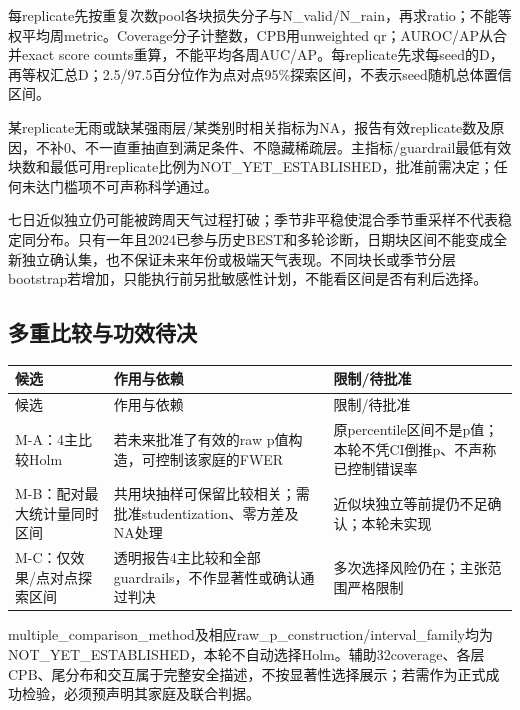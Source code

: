 \documentclass[UTF8,fontset=fandol,10pt]{ctexart}
\begin{document}
每replicate先按重复次数pool各块损失分子与N\_\allowbreak{}valid/\allowbreak{}N\_\allowbreak{}rain，再求ratio；不能等权平均周metric。Coverage分子计整数，CPB用unweighted qr；AUROC/\allowbreak{}AP从合并exact score counts重算，不能平均各周AUC/\allowbreak{}AP。每replicate先求每seed的D，再等权汇总D；2.5/\allowbreak{}97.5百分位作为点对点95\%探索区间，不表示seed随机总体置信区间。

某replicate无雨或缺某强雨层/\allowbreak{}某类别时相关指标为NA，报告有效replicate数及原因，不补0、不一直重抽直到满足条件、不隐藏稀疏层。主指标/\allowbreak{}guardrail最低有效块数和最低可用replicate比例为NOT\_\allowbreak{}YET\_\allowbreak{}ESTABLISHED，批准前需决定；任何未达门槛项不可声称科学通过。

七日近似独立仍可能被跨周天气过程打破；季节非平稳使混合季节重采样不代表稳定同分布。只有一年且2024已参与历史BEST和多轮诊断，日期块区间不能变成全新独立确认集，也不保证未来年份或极端天气表现。不同块长或季节分层bootstrap若增加，只能执行前另批敏感性计划，不能看区间是否有利后选择。

\subsection{多重比较与功效待决}

\begingroup\small\setlength{\tabcolsep}{3pt}\renewcommand{\arraystretch}{1.12}
\begin{longtable}{>{\raggedright\arraybackslash}p{\dimexpr(\linewidth-6\tabcolsep)/3\relax}>{\raggedright\arraybackslash}p{\dimexpr(\linewidth-6\tabcolsep)/3\relax}>{\raggedright\arraybackslash}p{\dimexpr(\linewidth-6\tabcolsep)/3\relax}}
\toprule
候选 & 作用与依赖 & 限制/\allowbreak{}待批准 \\
\midrule\endfirsthead
候选 & 作用与依赖 & 限制/\allowbreak{}待批准 \\
\midrule\endhead
M-A：4主比较Holm & 若未来批准了有效的raw p值构造，可控制该家庭的FWER & 原percentile区间不是p值；本轮不凭CI倒推p、不声称已控制错误率 \\
M-B：配对最大统计量同时区间 & 共用块抽样可保留比较相关；需批准studentization、零方差及NA处理 & 近似块独立等前提仍不足确认；本轮未实现 \\
M-C：仅效果/\allowbreak{}点对点探索区间 & 透明报告4主比较和全部guardrails，不作显著性或确认通过判决 & 多次选择风险仍在；主张范围严格限制 \\
\bottomrule\end{longtable}\endgroup

multiple\_\allowbreak{}comparison\_\allowbreak{}method及相应raw\_\allowbreak{}p\_\allowbreak{}construction/\allowbreak{}interval\_\allowbreak{}family均为NOT\_\allowbreak{}YET\_\allowbreak{}ESTABLISHED，本轮不自动选择Holm。辅助32coverage、各层CPB、尾分布和交互属于完整安全描述，不按显著性选择展示；若需作为正式成功检验，必须预声明其家庭及联合判据。
\end{document}
